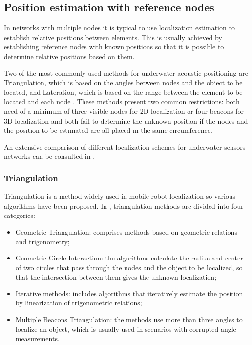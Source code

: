 
\subsection{Position estimation with reference nodes}

In networks with multiple nodes it is typical to use localization estimation to establish relative positions between elements. This is usually achieved by establishing reference nodes with known positions so that it is possible to determine relative positions based on them.

Two of the most commonly used methods for underwater acoustic positioning are Triangulation, which is based on the angles between nodes and the object to be located,  and Lateration, which is based on the range between the element to be located and each node \cite{triang-later}. These methods present two common restrictions: both need of a minimum of three visible nodes for 2D localization or four beacons for 3D localization and both fail to determine the unknown position if the nodes and the position to be estimated are all placed in the same circumference.

An extensive comparison of different localization schemes for underwater sensors networks can be consulted in \cite{suvey-loc}. 

\subsubsection{Triangulation}

Triangulation is a method widely used in mobile robot localization so various algorithms have been proposed. In \cite{class-triang}, triangulation methods are divided into four categories: 

\begin{itemize}
	\item Geometric Triangulation: comprises methods based on geometric relations and trigonometry;
	
	\item Geometric Circle Interaction: the algorithms calculate the radius and center of two circles that pass through the nodes and the object to be localized, so that the intersection between them gives the unknown localization;
		
	\item Iterative methods: includes algorithms that iteratively estimate the position by linearization of trigonometric relations;
	
	\item Multiple Beacons Triangulation: the methods use more than three angles to localize an object, which is usually used in scenarios with corrupted angle measurements.
\end{itemize}


